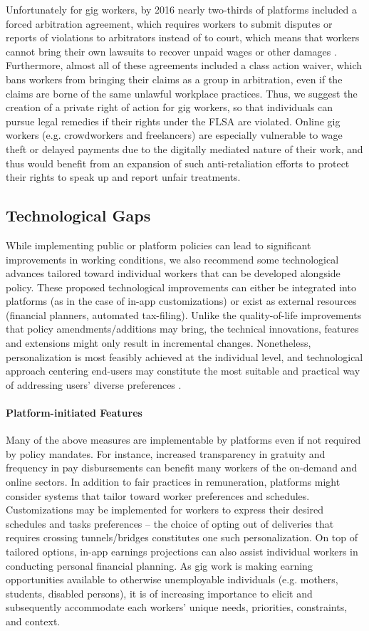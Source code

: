 Unfortunately for gig workers, by 2016 nearly two-thirds of platforms included a forced arbitration agreement, which requires workers to submit disputes or reports of violations to arbitrators instead of to court, which means that workers cannot bring their own lawsuits to recover unpaid wages or other damages \cite{noauthor_2021-ms}. Furthermore, almost all of these agreements included a class action waiver, which bans workers from bringing their claims as a group in arbitration, even if the claims are borne of the same unlawful workplace practices. Thus, we suggest the creation of a private right of action for gig workers, so that individuals can pursue legal remedies if their rights under the FLSA are violated. Online gig workers (e.g. crowdworkers and freelancers) are especially vulnerable to wage theft or delayed payments due to the digitally mediated nature of their work, and thus would benefit from an expansion of such anti-retaliation efforts to protect their rights to speak up and report unfair treatments.

\subsection{Technological Gaps}
While implementing public or platform policies can lead to significant improvements in working conditions, we also recommend some technological advances tailored toward individual workers that can be developed alongside policy. These proposed technological improvements can either be integrated into platforms (as in the case of in-app customizations) or exist as external resources (financial planners, automated tax-filing). Unlike the quality-of-life improvements that policy amendments/additions may bring, the technical innovations, features and extensions might only result in incremental changes. Nonetheless, personalization is most feasibly achieved at the individual level, and technological approach centering end-users may constitute the most suitable and practical way of addressing users' diverse preferences \cite{chiworkli}.

\paragraph{Platform-initiated Features}
Many of the above measures are implementable by platforms even if not required by policy mandates. For instance, increased transparency in gratuity and frequency in pay disbursements can benefit many workers of the on-demand and online sectors. In addition to fair practices in remuneration, platforms might consider systems that tailor toward worker preferences and schedules. Customizations may be implemented for workers to express their desired schedules and tasks preferences – the choice of opting out of deliveries that requires crossing tunnels/bridges constitutes one such personalization. On top of tailored options, in-app earnings projections can also assist individual workers in conducting personal financial planning. As gig work is making earning opportunities available to otherwise unemployable individuals (e.g. mothers, students, disabled persons), it is of increasing importance to elicit and subsequently accommodate each workers' unique needs, priorities, constraints, and context. 

